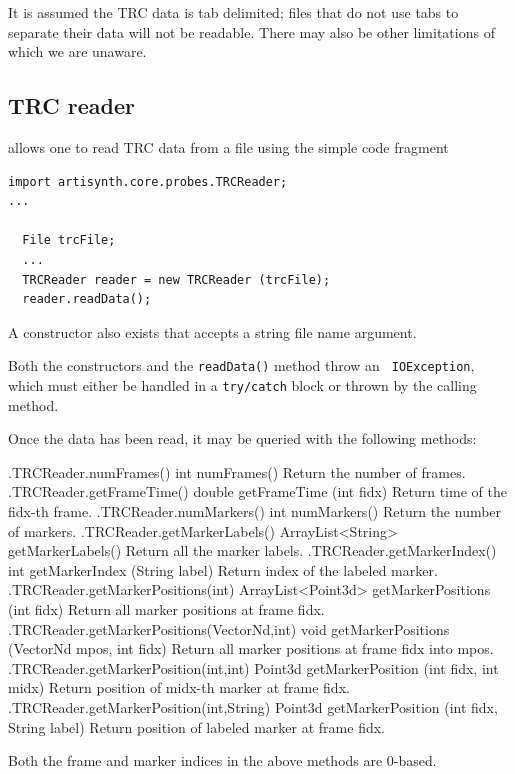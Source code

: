 \begin{sideblock}
It is assumed the TRC data is tab delimited; files that do not use tabs to
separate their data will not be readable. There may also be other limitations of
which we are unaware.
\end{sideblock}

\subsection{TRC reader}
\label{TRCReader:sec}

 allows one to read TRC data from a file using
the simple code fragment
%
\begin{lstlisting}[]
import artisynth.core.probes.TRCReader;
...

  File trcFile;
  ...
  TRCReader reader = new TRCReader (trcFile);
  reader.readData();
\end{lstlisting}
%
A constructor also exists that accepts a string file name argument.

\begin{sideblock}
Both the constructors and the {\tt readData()} method throw an {\tt
IOException}, which must either be handled in a {\tt try/catch} block or thrown
by the calling method.
\end{sideblock}

Once the data has been read, it may be queried with the following methods:
%
\begin{methodtable}{0.5}{0.5}
\midline
%
\methodentry
{\probes.TRCReader.numFrames()}%
{int numFrames()}%
{Return the number of frames.}%
%
\methodentry
{\probes.TRCReader.getFrameTime()}%
{double getFrameTime (int fidx)}%
{Return time of the fidx-th frame.}%
%
\methodentry
{\probes.TRCReader.numMarkers()}%
{int numMarkers()}%
{Return the number of markers.}%
%
\methodentry
{\probes.TRCReader.getMarkerLabels()}%
{ArrayList<String> getMarkerLabels()}%
{Return all the marker labels.}%
%
\methodentry
{\probes.TRCReader.getMarkerIndex()}%
{int getMarkerIndex (String label)}%
{Return index of the labeled marker.}%
%
\methodentry
{\probes.TRCReader.getMarkerPositions(int)}%
{ArrayList<Point3d> getMarkerPositions (int fidx)}%
{Return all marker positions at frame fidx.}%
%
\methodentry
{\probes.TRCReader.getMarkerPositions(VectorNd,int)}%
{void getMarkerPositions (VectorNd mpos, int fidx)}%
{Return all marker positions at frame fidx into mpos.}%
%
\methodentry
{\probes.TRCReader.getMarkerPosition(int,int)}%
{Point3d getMarkerPosition (int fidx, int midx)}%
{Return position of midx-th marker at frame fidx.}%
%
\methodentry
{\probes.TRCReader.getMarkerPosition(int,String)}%
{Point3d getMarkerPosition (int fidx, String label)}%
{Return position of labeled marker at frame fidx.}%
%
\midline
\end{methodtable}
%
Both the frame and marker indices in the above methods are 0-based.

